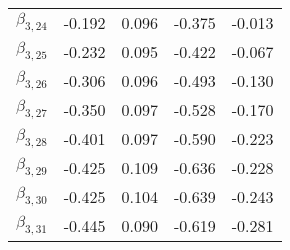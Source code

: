 \begin{tabular}{lrrrr}
$\beta_{3,24}$ & -0.192 &     0.096 &   -0.375 &    -0.013 \\
$\beta_{3,25}$ & -0.232 &     0.095 &   -0.422 &    -0.067 \\
$\beta_{3,26}$ & -0.306 &     0.096 &   -0.493 &    -0.130 \\
$\beta_{3,27}$ & -0.350 &     0.097 &   -0.528 &    -0.170 \\
$\beta_{3,28}$ & -0.401 &     0.097 &   -0.590 &    -0.223 \\
$\beta_{3,29}$ & -0.425 &     0.109 &   -0.636 &    -0.228 \\
$\beta_{3,30}$ & -0.425 &     0.104 &   -0.639 &    -0.243 \\
$\beta_{3,31}$ & -0.445 &     0.090 &   -0.619 &    -0.281 \\
\bottomrule
\end{tabular}
